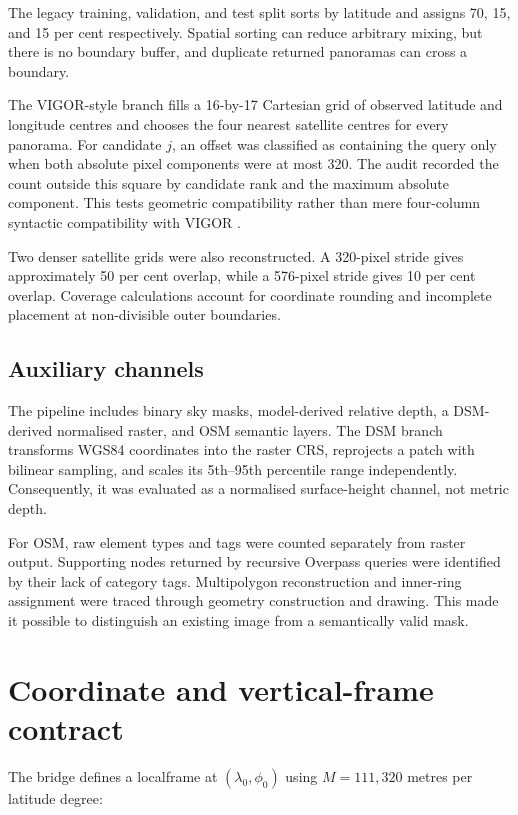 The legacy training, validation, and test split sorts by latitude and assigns
70, 15, and 15 per cent respectively.  Spatial sorting can reduce arbitrary
mixing, but there is no boundary buffer, and duplicate returned panoramas can
cross a boundary.

The VIGOR-style branch fills a 16-by-17 Cartesian grid of observed
latitude and longitude centres and chooses the four nearest satellite centres
for every panorama.  For candidate $j$, an offset was classified as containing
the query only when both absolute pixel components were at most 320.  The
audit recorded the count outside this square by candidate rank and the maximum
absolute component.  This tests geometric compatibility rather than mere
four-column syntactic compatibility with VIGOR \cite{zhu2021vigor}.

Two denser satellite grids were also reconstructed.  A 320-pixel stride gives
approximately 50 per cent overlap, while a 576-pixel stride gives 10 per cent
overlap.  Coverage calculations account for coordinate rounding and incomplete
placement at non-divisible outer boundaries.

\subsection{Auxiliary channels}

The pipeline includes binary sky masks, model-derived relative depth, a
DSM-derived normalised raster, and OSM semantic layers.  The DSM branch
transforms WGS84 coordinates into the raster CRS, reprojects a patch with
bilinear sampling, and scales its 5th--95th percentile range independently.
Consequently, it was evaluated as a normalised surface-height channel, not
metric depth.

For OSM, raw element types and tags were counted separately from raster output.
Supporting nodes returned by recursive Overpass queries were identified by
their lack of category tags.  Multipolygon reconstruction and inner-ring
assignment were traced through geometry construction and drawing.  This made
it possible to distinguish an existing image from a semantically valid mask.

\section{Coordinate and vertical-frame contract}

The bridge defines a \gls{localframe} at $(\lambda_0,\phi_0)$ using
$M=111{,}320$ metres per latitude degree:

